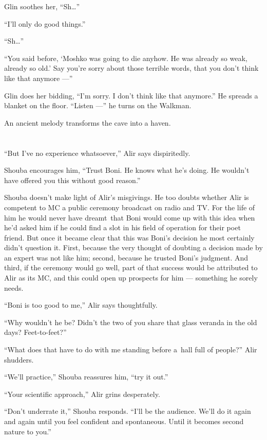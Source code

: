 \documentclass[twoside,11pt]{book}
\begin{document}
Glin soothes her, ``Sh{\ldots}''

``I'll only do good things.''

``Sh{\ldots}''

``You said before, `Moshko was going to die anyhow. He was already so weak, already so old.' Say you're
sorry about those terrible words, that you don't think like that anymore ---''

Glin does her bidding, ``I'm sorry. I don't think like that anymore.'' He spreads a blanket on
the floor. ``Listen ---'' he turns on the Walkman.

An ancient melody transforms the cave into a haven.


\bigskip

\chapter{}

``But I've no experience whatsoever,'' Alir says dispiritedly.

Shouba encourages him, ``Trust Boni. He knows what he's doing. He wouldn't have offered you this without
good reason.''

Shouba doesn't make light of Alir's misgivings. He too doubts whether Alir is competent to MC a public ceremony
broadcast on radio and TV. For the life of him he would never have dreamt~that Boni would come up with this idea when
he'd asked him if he could find a slot in his field of operation for their poet friend. But once it became clear that
this was Boni's decision he most certainly didn't question it. First, because the very thought of doubting a decision
made by an expert was not like him; second, because he trusted Boni's judgment. And third, if the ceremony would go
well, part of that success would be attributed to Alir as its MC, and this could open up prospects for him --- something
he sorely needs.

``Boni is too good to me,'' Alir says thoughtfully.

``Why wouldn't he be? Didn't the two of you share that glass veranda in the old days?
Feet-to-feet?''

``What does that have to do with me standing before a~hall full of people?'' Alir shudders.

``We'll practice,'' Shouba reassures him, ``try it out.''

``Your scientific approach,'' Alir grins desperately.

``Don't underrate it,'' Shouba responds. ``I'll be the audience. We'll do it
again and again until you feel confident and spontaneous. Until it becomes second nature to you.''
\end{document}
